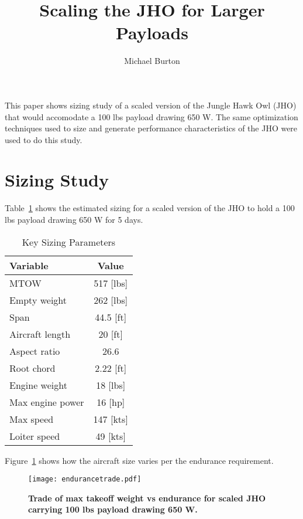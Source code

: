 \documentclass[10pt, a4paper]{article}
\begin{document}
\title{Scaling the JHO for Larger Payloads}
\author{Michael Burton}
\maketitle

This paper shows sizing study of a scaled version of the Jungle Hawk Owl (JHO) that would accomodate a 100 lbs payload drawing 650 W.  
The same optimization techniques used to size and generate performance characteristics of the JHO were used to do this study. 

\section*{Sizing Study}

Table~\ref{t:keyvals} shows the estimated sizing for a scaled version of the JHO to hold a 100 lbs payload drawing 650 W for 5 days.

\begin{table}[h!]
    \centering
    \begin{tabular}{lc}
        Variable         & Value         \\ \hline \hline
        MTOW             & 517 {[}lbs{]} \\ 
        Empty weight     & 262 {[}lbs{]} \\ 
        Span             & 44.5 {[}ft{]} \\ 
        Aircraft length  & 20 {[}ft{]}   \\ 
        Aspect ratio     & 26.6          \\ 
        Root chord       & 2.22 {[}ft{]} \\ 
        Engine weight    & 18 {[}lbs{]}  \\ 
        Max engine power & 16 {[}hp{]}   \\ 
        Max speed        & 147 {[}kts{]} \\ 
        Loiter speed     & 49 {[}kts{]}  \\ 
    \end{tabular}
    \caption{Key Sizing Parameters}
    \label{t:keyvals}
\end{table}

Figure~\ref{f:endurancetrade} shows how the aircraft size varies per the endurance requirement. 

\begin{figure}[H]
    \begin{center}
        \texttt{[image: endurancetrade.pdf]}
        \caption{\textbf{Trade of max takeoff weight vs endurance for scaled JHO carrying 100 lbs payload drawing 650 W.}}
        \label{f:endurancetrade}
    \end{center}
\end{figure}
\end{document}
